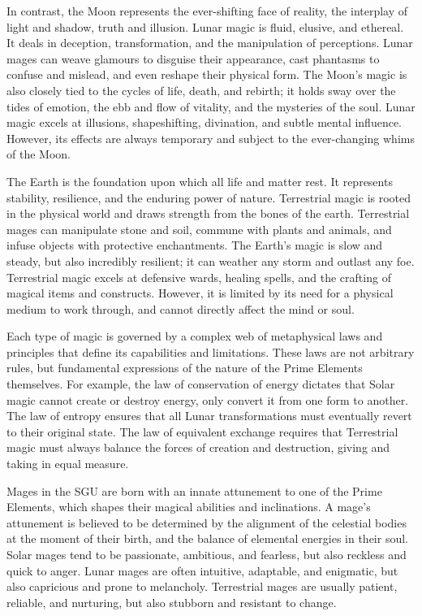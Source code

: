 \documentclass[12pt]{article}
\begin{document}
In contrast, the Moon represents the ever-shifting face of reality, the interplay of light and shadow, truth and illusion. Lunar magic is fluid, elusive, and ethereal. It deals in deception, transformation, and the manipulation of perceptions. Lunar mages can weave glamours to disguise their appearance, cast phantasms to confuse and mislead, and even reshape their physical form. The Moon's magic is also closely tied to the cycles of life, death, and rebirth; it holds sway over the tides of emotion, the ebb and flow of vitality, and the mysteries of the soul. Lunar magic excels at illusions, shapeshifting, divination, and subtle mental influence. However, its effects are always temporary and subject to the ever-changing whims of the Moon.

The Earth is the foundation upon which all life and matter rest. It represents stability, resilience, and the enduring power of nature. Terrestrial magic is rooted in the physical world and draws strength from the bones of the earth. Terrestrial mages can manipulate stone and soil, commune with plants and animals, and infuse objects with protective enchantments. The Earth's magic is slow and steady, but also incredibly resilient; it can weather any storm and outlast any foe. Terrestrial magic excels at defensive wards, healing spells, and the crafting of magical items and constructs. However, it is limited by its need for a physical medium to work through, and cannot directly affect the mind or soul.

Each type of magic is governed by a complex web of metaphysical laws and principles that define its capabilities and limitations. These laws are not arbitrary rules, but fundamental expressions of the nature of the Prime Elements themselves. For example, the law of conservation of energy dictates that Solar magic cannot create or destroy energy, only convert it from one form to another. The law of entropy ensures that all Lunar transformations must eventually revert to their original state. The law of equivalent exchange requires that Terrestrial magic must always balance the forces of creation and destruction, giving and taking in equal measure.

Mages in the SGU are born with an innate attunement to one of the Prime Elements, which shapes their magical abilities and inclinations. A mage's attunement is believed to be determined by the alignment of the celestial bodies at the moment of their birth, and the balance of elemental energies in their soul. Solar mages tend to be passionate, ambitious, and fearless, but also reckless and quick to anger. Lunar mages are often intuitive, adaptable, and enigmatic, but also capricious and prone to melancholy. Terrestrial mages are usually patient, reliable, and nurturing, but also stubborn and resistant to change.
\end{document}

